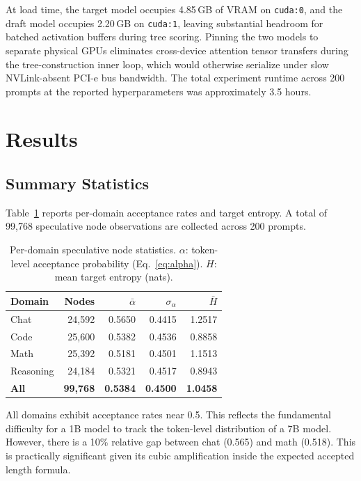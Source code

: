 \documentclass[conference]{IEEEtran}
\begin{document}
At load time, the target model occupies 4.85\,GB of VRAM on \texttt{cuda:0},
and the draft model occupies 2.20\,GB on \texttt{cuda:1}, leaving substantial
headroom for batched activation buffers during tree scoring.
Pinning the two models to separate physical GPUs eliminates cross-device
attention tensor transfers during the tree-construction inner loop, which
would otherwise serialize under slow NVLink-absent PCI-e bus bandwidth.
The total experiment runtime across 200 prompts at the reported
hyperparameters was approximately 3.5 hours.

\section{Results}

\subsection{Summary Statistics}

Table~\ref{tab:summary} reports per-domain acceptance rates and target entropy.
A total of 99,768 speculative node observations are collected across 200 prompts.

\begin{table}[h]
\centering
\caption{Per-domain speculative node statistics. $\alpha$: token-level
acceptance probability (Eq.~\ref{eq:alpha}). $H$: mean target entropy (nats).}
\label{tab:summary}
\begin{tabular}{lrrrr}
\toprule
Domain & Nodes & $\bar{\alpha}$ & $\sigma_\alpha$ & $\bar{H}$ \\
\midrule
Chat      & 24{,}592 & 0.5650 & 0.4415 & 1.2517 \\
Code      & 25{,}600 & 0.5382 & 0.4536 & 0.8858 \\
Math      & 25{,}392 & 0.5181 & 0.4501 & 1.1513 \\
Reasoning & 24{,}184 & 0.5321 & 0.4517 & 0.8943 \\
\midrule
\textbf{All} & \textbf{99,768} & \textbf{0.5384} & \textbf{0.4500} & \textbf{1.0458} \\
\bottomrule
\end{tabular}
\end{table}

All domains exhibit acceptance rates near 0.5. This reflects the fundamental
difficulty for a 1B model to track the token-level distribution of a 7B model.
However, there is a 10\% relative gap between chat (0.565) and math (0.518). This is
practically significant given its cubic amplification inside the expected
accepted length formula.
\end{document}
